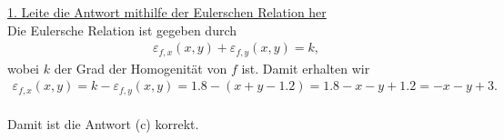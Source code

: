 \underline{1. Leite die Antwort mithilfe der Eulerschen Relation her}\\
Die Eulersche Relation ist gegeben durch
\begin{align*}
\varepsilon_{f,x}(x,y) + \varepsilon_{f,y}(x,y) = k,
\end{align*}
wobei $ k $ der Grad der Homogenität von $ f $ ist.
Damit erhalten wir
\begin{align*}
\varepsilon_{f,x}(x,y) = k - \varepsilon_{f,y}(x,y)
= 1.8 - (x+y-1.2)
= 1.8 -x-y +1.2 =-x-y+3.
\end{align*}
\ \\
Damit ist die Antwort (c) korrekt.

\newpage